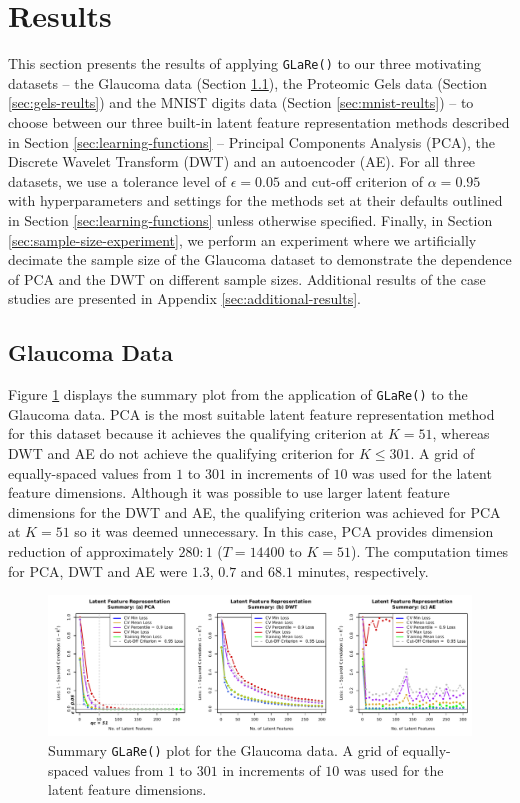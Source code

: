 \section{Results}\label{sec:results}

This section presents the results of applying \texttt{GLaRe()} to our three motivating datasets --  the Glaucoma data (Section \ref{sec:glaucoma-reults}), the Proteomic Gels data (Section \ref{sec:gels-reults}) and the MNIST digits data (Section \ref{sec:mnist-reults}) -- to choose between our three built-in latent feature representation methods described in Section \ref{sec:learning-functions} -- Principal Components Analysis (PCA), the Discrete Wavelet Transform (DWT) and an autoencoder (AE).
For all three datasets, we use a tolerance level of $\epsilon = 0.05$ and cut-off criterion of $\alpha=0.95$ with hyperparameters and settings for the methods set at their defaults outlined in Section \ref{sec:learning-functions} unless otherwise specified.
Finally, in Section \ref{sec:sample-size-experiment}, we perform an experiment where we artificially decimate the sample size of the Glaucoma dataset to demonstrate the dependence of PCA and the DWT on different sample sizes.
Additional results of the case studies are presented in Appendix \ref{sec:additional-results}.

\subsection{Glaucoma Data}\label{sec:glaucoma-reults}

Figure \ref{fig:eye-results} displays the summary plot from the application of \texttt{GLaRe()} to the Glaucoma data.
PCA is the most suitable latent feature representation method for this dataset because it achieves the qualifying criterion at $K=51$, whereas DWT and AE do not achieve the qualifying criterion for $K \leq 301$.
A grid of equally-spaced values from $1$ to $301$ in increments of $10$ was used for the latent feature dimensions.
Although it was possible to use larger latent feature dimensions for the DWT and AE, the qualifying criterion was achieved for PCA at $K=51$ so it was deemed unnecessary.
In this case, PCA provides dimension reduction of approximately $280:1$ ($T = 14400$ to $K = 51$).
The computation times for PCA, DWT and AE were $1.3$, $0.7$ and $68.1$ minutes, respectively.


\begin{figure}
    \centering
    \includegraphics[width=1\textwidth]{figures/eye-results.pdf}
    \caption{Summary \texttt{GLaRe()} plot for the Glaucoma data. A grid of equally-spaced values from $1$ to $301$ in increments of $10$ was used for the latent feature dimensions.}
    \label{fig:eye-results}
\end{figure}

